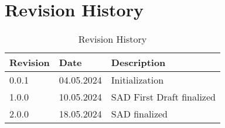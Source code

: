 \chapter*{Revision History}
 
\begin{table}[H]
\centering
\begin{tabular}{|l|l|l|} 
\hline
Revision & Date       & Description      \\ 
\hline
0.0.1    & 04.05.2024 & Initialization   \\ 
\hline
1.0.0    & 10.05.2024 & SAD First Draft finalized  \\
\hline
2.0.0    & 18.05.2024 & SAD finalized  \\
\hline
\end{tabular}
\caption{Revision History}
\end{table}
